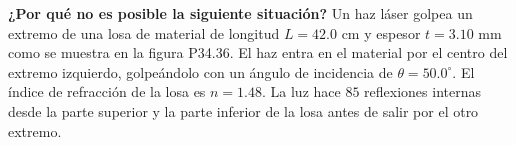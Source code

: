 \item \textbf{¿Por qué no es posible la siguiente situación?}
Un haz láser golpea un extremo de una losa de material de longitud $L = 42.0\text{ cm}$ y espesor $t = 3.10\text{ mm}$ como se muestra en la figura P34.36. El haz entra en el material por el centro del extremo izquierdo, golpeándolo con un ángulo de incidencia de $\theta = 50.0^\circ$. El índice de refracción de la losa es $n = 1.48$. La luz hace $85$ reflexiones internas desde la parte superior y la parte inferior de la losa antes de salir por el otro extremo.